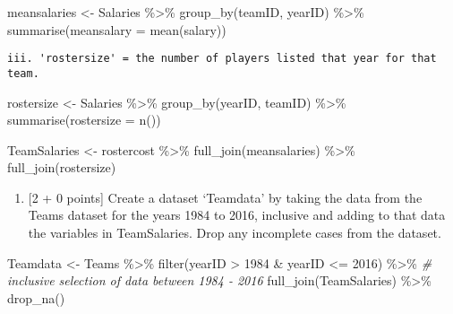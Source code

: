 \documentclass[
]{article}
\newenvironment{Shaded}{\begin{snugshade}}{\end{snugshade}}
\newcommand{\AttributeTok}[1]{\textcolor[rgb]{0.77,0.63,0.00}{#1}}
\newcommand{\CommentTok}[1]{\textcolor[rgb]{0.56,0.35,0.01}{\textit{#1}}}
\newcommand{\DecValTok}[1]{\textcolor[rgb]{0.00,0.00,0.81}{#1}}
\newcommand{\FunctionTok}[1]{\textcolor[rgb]{0.00,0.00,0.00}{#1}}
\newcommand{\NormalTok}[1]{#1}
\newcommand{\OtherTok}[1]{\textcolor[rgb]{0.56,0.35,0.01}{#1}}
\newcommand{\SpecialCharTok}[1]{\textcolor[rgb]{0.00,0.00,0.00}{#1}}
\providecommand{\tightlist}{%
  \setlength{\itemsep}{0pt}\setlength{\parskip}{0pt}}
\begin{document}
\begin{Shaded}
\begin{Highlighting}[]
\NormalTok{meansalaries }\OtherTok{\textless{}{-}}\NormalTok{ Salaries }\SpecialCharTok{\%\textgreater{}\%}
  \FunctionTok{group\_by}\NormalTok{(teamID, yearID) }\SpecialCharTok{\%\textgreater{}\%}
  \FunctionTok{summarise}\NormalTok{(}\AttributeTok{meansalary =} \FunctionTok{mean}\NormalTok{(salary))}
\end{Highlighting}
\end{Shaded}

\begin{verbatim}
iii. 'rostersize' = the number of players listed that year for that team.
\end{verbatim}

\begin{Shaded}
\begin{Highlighting}[]
\NormalTok{rostersize }\OtherTok{\textless{}{-}}\NormalTok{ Salaries }\SpecialCharTok{\%\textgreater{}\%}
  \FunctionTok{group\_by}\NormalTok{(yearID, teamID) }\SpecialCharTok{\%\textgreater{}\%}
  \FunctionTok{summarise}\NormalTok{(}\AttributeTok{rostersize =} \FunctionTok{n}\NormalTok{())}
\end{Highlighting}
\end{Shaded}

\begin{Shaded}
\begin{Highlighting}[]
\NormalTok{TeamSalaries }\OtherTok{\textless{}{-}}\NormalTok{ rostercost }\SpecialCharTok{\%\textgreater{}\%}
  \FunctionTok{full\_join}\NormalTok{(meansalaries) }\SpecialCharTok{\%\textgreater{}\%}
  \FunctionTok{full\_join}\NormalTok{(rostersize)}
\end{Highlighting}
\end{Shaded}

\begin{enumerate}
\def\labelenumi{\alph{enumi}.}
\setcounter{enumi}{4}
\tightlist
\item
  {[}2 + 0 points{]} Create a dataset `Teamdata' by taking the data from
  the Teams dataset for the years 1984 to 2016, inclusive and adding to
  that data the variables in TeamSalaries. Drop any incomplete cases
  from the dataset.
\end{enumerate}

\begin{Shaded}
\begin{Highlighting}[]
\NormalTok{Teamdata }\OtherTok{\textless{}{-}}\NormalTok{ Teams }\SpecialCharTok{\%\textgreater{}\%}
  \FunctionTok{filter}\NormalTok{(yearID }\SpecialCharTok{\textgreater{}} \DecValTok{1984} \SpecialCharTok{\&}\NormalTok{ yearID }\SpecialCharTok{\textless{}=} \DecValTok{2016}\NormalTok{) }\SpecialCharTok{\%\textgreater{}\%} \CommentTok{\# inclusive selection of data between 1984 {-} 2016}
  \FunctionTok{full\_join}\NormalTok{(TeamSalaries) }\SpecialCharTok{\%\textgreater{}\%}
  \FunctionTok{drop\_na}\NormalTok{()}
\end{Highlighting}
\end{Shaded}
\end{document}
